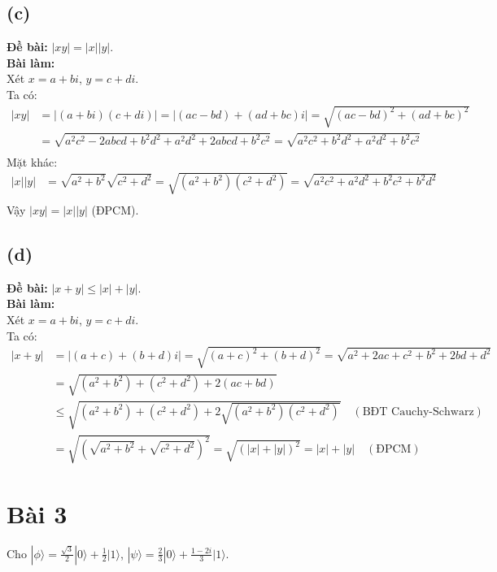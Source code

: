 \subsection{(c)}
\textbf{Đề bài:} $|xy|=|x||y|$.\\
\textbf{Bài làm:}
\\Xét $x=a+bi$, $y=c+di$. \\
Ta có:
\begin{align}
    |xy| &= |(a + bi)(c + di)| = |(ac - bd) + (ad + bc)i| = \sqrt{(ac - bd)^{2} + (ad + bc)^{2}}\\
    &= \sqrt{a^{2}c^{2} - 2abcd + b^{2}d^{2} + a^{2}d^{2} + 2abcd + b^{2}c^{2}} = \sqrt{a^{2}c^{2} + b^{2}d^{2} + a^{2}d^{2} + b^{2}c^{2}}\\
\end{align}
Mặt khác:
\begin{align}
    |x||y| &= \sqrt{a^{2} + b^{2}}\sqrt{c^{2} + d^{2}} = \sqrt{(a^{2} + b^{2})(c^{2} + d^{2})} = \sqrt{a^{2}c^{2} + a^{2}d^{2} + b^{2}c^{2} + b^{2}d^{2}}\\ 
\end{align}
Vậy $|xy| = |x||y|$ (ĐPCM).

\subsection{(d)}
\textbf{Đề bài:} $|x+y|\le|x|+|y|$.\\
\textbf{Bài làm:}\\
Xét $x=a+bi$, $y=c+di$. \\
Ta có:
\begin{align*}
    |x+y| &= |(a+c) + (b+d)i| = \sqrt{(a+c)^{2} + (b+d)^{2}} = \sqrt{a^{2} + 2ac + c^{2} + b^{2} + 2bd + d^{2}}\\
    &= \sqrt{(a^{2} + b^{2}) + (c^{2} + d^{2}) + 2(ac + bd)}\\
    &\le \sqrt{(a^{2} + b^{2}) + (c^{2} + d^{2}) + 2\sqrt{(a^{2} + b^{2})(c^{2} + d^{2})}} \quad (\text{BĐT Cauchy-Schwarz})\\
    &= \sqrt{(\sqrt{a^{2} + b^{2}} + \sqrt{c^{2} + d^{2}})^{2}} = \sqrt{(|x| + |y|)^2} =|x| + |y| \quad (\text{ĐPCM})
\end{align*}

\section{Bài 3}
Cho $|\phi\rangle=\frac{\sqrt{3}}{2}|0\rangle+\frac{1}{2}|1\rangle$, $|\psi\rangle=\frac{2}{3}|0\rangle+\frac{1-2i}{3}|1\rangle$.

